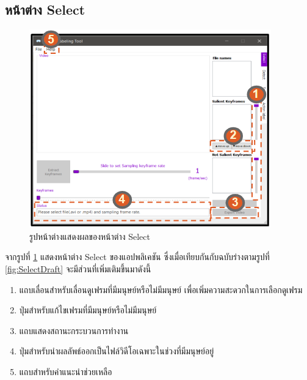 \subsection*{หน้าต่าง Select}
\begin{figure}[!ht]
  \centering
    \includegraphics[scale=1.2]{chapter4/images/New_Final_ui/Select.png}
    \caption{รูปหน้าต่างแสดงผลของหน้าต่าง Select}
    \label{fig:final_select}
\end{figure}
จากรูปที่ \ref{fig:final_select} แสดงหน้าต่าง Select ของแอปพลิเคชัน ซึ่งเมื่อเทียบกันกับฉบับร่างตามรูปที่ \ref{fig:SelectDraft} จะมีส่วนที่เพิ่มเติมขึ้นมาดังนี้
\begin{enumerate}
	\item แถบเลื่อนสำหรับเลื่อนดูเฟรมที่มีมนุษย์หรือไม่มีมนุษย์ เพื่อเพิ่มความสะดวกในการเลือกดูเฟรม
	\item ปุ่มสำหรับแก้ไขเฟรมที่มีมนุษย์หรือไม่มีมนุษย์
	\item แถบแสดงสถานะกระบวนการทำงาน
	\item ปุ่มสำหรับนำผลลัพธ์ออกเป็นไฟล์วิดีโอเฉพาะในช่วงที่มีมนุษย์อยู่
	\item แถบสำหรับคำแนะนำช่วยเหลือ
\end{enumerate}		

\clearpage
